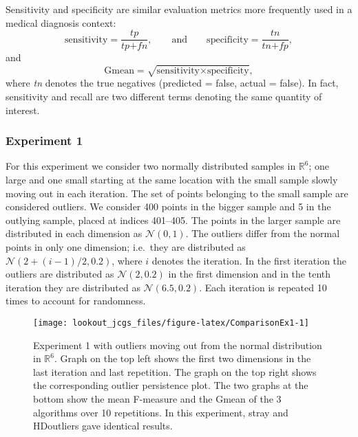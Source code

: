 \documentclass[12pt]{article}
\theoremstyle{definition}
\theoremstyle{definition}
\theoremstyle{definition}
\theoremstyle{remark}
\begin{document}
Sensitivity and specificity are similar evaluation metrics more frequently used in a medical diagnosis context:
\begin{equation}\label{eq:ss}
    \text{sensitivity} = \frac{ \textit{tp} }{\textit{tp} + \textit{fn}}  , \qquad \text{and} \qquad \text{specificity} = \frac{\textit{tn}}{\textit{tn} + \textit{fp}}  ,
\end{equation}
and
\begin{equation}\label{eq:gmean}
    \text{Gmean} = \sqrt{ \text{sensitivity} \times \text{specificity}}  ,
\end{equation}
where \emph{tn} denotes the true negatives (predicted = false, actual = false). In fact, sensitivity and recall are two different terms denoting the same quantity of interest.

\hypertarget{experiment-1}{%
\subsubsection*{Experiment 1}\label{experiment-1}}

For this experiment we consider two normally distributed samples in \(\mathbb{R}^6\); one large and one small starting at the same location with the small sample slowly moving out in each iteration. The set of points belonging to the small sample are considered outliers. We consider 400 points in the bigger sample and 5 in the outlying sample, placed at indices 401--405. The points in the larger sample are distributed in each dimension as \(\mathcal{N}(0, 1)\). The outliers differ from the normal points in only one dimension; i.e.~they are distributed as \(\mathcal{N}\left(2 + (i-1)/2, 0.2 \right)\), where \(i\) denotes the iteration. In the first iteration the outliers are distributed as \(\mathcal{N}\left(2, 0.2 \right)\) in the first dimension and in the tenth iteration they are distributed as \(\mathcal{N}\left(6.5, 0.2 \right)\). Each iteration is repeated 10 times to account for randomness.

\begin{figure}
\texttt{[image: lookout\_jcgs\_files/figure-latex/ComparisonEx1-1]} \caption{Experiment 1 with outliers moving out from the normal distribution in $\mathbb{R}^6$. Graph on the top left shows the first two dimensions in the last iteration and last repetition. The graph on the top right shows the corresponding outlier persistence plot. The two graphs at the bottom show the mean F-measure and the Gmean of the 3 algorithms over 10 repetitions. In this experiment, stray and HDoutliers gave identical results.}\label{fig:ComparisonEx1}
\end{figure}
\end{document}

